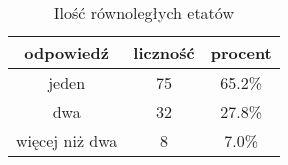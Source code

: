 \begin{table}[H]
\caption{Ilość równoległych etatów}
\centering
\begin{tabular}{ | c | c | c |}
\hline
odpowiedź & liczność & procent\\
\hline
jeden  &  75  & 65.2\% \\
\hline
dwa  &  32  & 27.8\% \\
\hline
więcej niż dwa  &  8  & 7.0\% \\
\hline
\end{tabular}
\label{tab:Q2}
\end{table}

